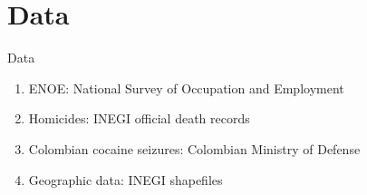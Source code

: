 \documentclass[aspectratio=169]{beamer}
\begin{document}
\section{Data}

\begin{frame}{Data}
\begin{enumerate}
    \item ENOE: National Survey of Occupation and Employment
    \item Homicides: INEGI official death records
    \item Colombian cocaine seizures: Colombian Ministry of Defense
    \item Geographic data: INEGI shapefiles
\end{enumerate}
\end{frame}
\end{document}
